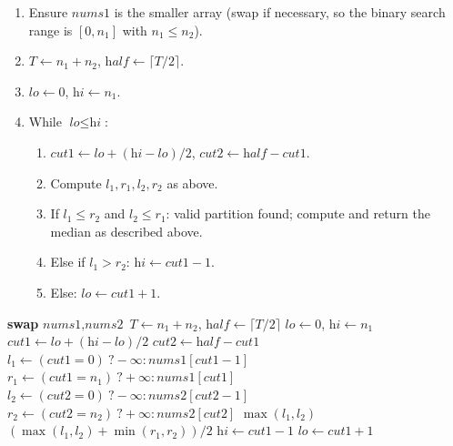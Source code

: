 \begin{enumerate}
  \item Ensure $\textit{nums1}$ is the smaller array (swap if necessary,
        so the binary search range is $[0, n_1]$ with $n_1 \le n_2$).
  \item $T \gets n_1+n_2$, $\textit{half} \gets \lceil T/2 \rceil$.
  \item $\textit{lo} \gets 0$, $\textit{hi} \gets n_1$.
  \item While $\textit{lo} \le \textit{hi}$:
  \begin{enumerate}
    \item $\textit{cut1} \gets \textit{lo}+(\textit{hi}-\textit{lo})/2$,
          $\textit{cut2} \gets \textit{half}-\textit{cut1}$.
    \item Compute $l_1, r_1, l_2, r_2$ as above.
    \item If $l_1 \le r_2$ and $l_2 \le r_1$: valid partition found;
          compute and return the median as described above.
    \item Else if $l_1 > r_2$: $\textit{hi} \gets \textit{cut1}-1$.
    \item Else: $\textit{lo} \gets \textit{cut1}+1$.
  \end{enumerate}
\end{enumerate}

\begin{algorithm}[H]
\caption{Median of Two Sorted Arrays}
\begin{algorithmic}[1]
   \textbf{swap} $\textit{nums1}, \textit{nums2}$ \EndIf
  \State $T \gets n_1 + n_2$, $\textit{half} \gets \lceil T/2 \rceil$
  \State $\textit{lo} \gets 0$, $\textit{hi} \gets n_1$
    \State $\textit{cut1} \gets \textit{lo}+(\textit{hi}-\textit{lo})/2$
    \State $\textit{cut2} \gets \textit{half} - \textit{cut1}$
    \State $l_1 \gets (\textit{cut1}=0)\ ? -\infty : \textit{nums1}[\textit{cut1}-1]$
    \State $r_1 \gets (\textit{cut1}=n_1)\ ? +\infty : \textit{nums1}[\textit{cut1}]$
    \State $l_2 \gets (\textit{cut2}=0)\ ? -\infty : \textit{nums2}[\textit{cut2}-1]$
    \State $r_2 \gets (\textit{cut2}=n_2)\ ? +\infty : \textit{nums2}[\textit{cut2}]$
       \Return $\max(l_1, l_2)$
      \Else \Return $(\max(l_1,l_2)+\min(r_1,r_2))/2$ \EndIf
      \State $\textit{hi} \gets \textit{cut1} - 1$
    \Else
      \State $\textit{lo} \gets \textit{cut1} + 1$
    \EndIf
  \EndWhile
\EndProcedure
\end{algorithmic}
\end{algorithm}


